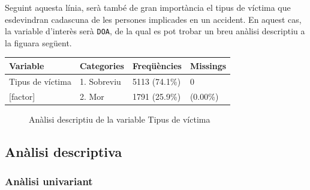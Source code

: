 \documentclass[11pt,longbibliography]{article}
\theoremstyle{definition}
\theoremstyle{remark}
\begin{document}
Seguint aquesta línia, serà també de gran importància el tipus de víctima que esdevindran cadascuna de les persones implicades en un accident. En aquest cas, la variable d'interès serà \texttt{DOA}, de la qual es pot trobar un breu anàlisi descriptiu a la figuara següent.

\begin{table}[H]
\centering
\begin{tabular}{llll}
\hline
Variable         & Categories  & Freqüències   & Missings \\ \hline
Tipus de víctima & 1. Sobreviu & 5113 (74.1\%) & 0        \\
{[}factor{]}     & 2. Mor      & 1791 (25.9\%) & (0.00\%) \\ \hline
\end{tabular}
\end{table}

\begin{figure}[h!]
\par
{}%
\hfill
{}%
\par

\caption{Anàlisi descriptiu de la variable Tipus de víctima}
\label{fig:F4}
\end{figure}


\subsection{Anàlisi descriptiva}

\subsubsection{Anàlisi univariant}
\end{document}
